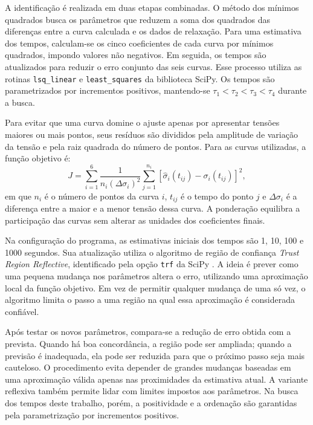 \documentclass[arial,centeredequations,english,brazilian,oneside,section=TITLE]{ifes8}
\begin{document}
A identificação é realizada em duas etapas combinadas. O método dos mínimos quadrados busca
os parâmetros que reduzem a soma dos quadrados das diferenças entre a curva calculada e
os dados de relaxação. Para uma estimativa dos tempos,
calculam-se os cinco coeficientes de cada curva por mínimos quadrados, impondo valores
não negativos. Em seguida, os tempos são atualizados para reduzir o erro conjunto das
seis curvas. Esse processo utiliza as rotinas \texttt{lsq\_linear} e
\texttt{least\_squares} da biblioteca SciPy. Os tempos são parametrizados por incrementos
positivos, mantendo-se $\tau_1<\tau_2<\tau_3<\tau_4$ durante a busca.

Para evitar que uma curva domine o ajuste apenas por apresentar tensões maiores ou mais
pontos, seus resíduos são divididos pela amplitude de variação da tensão e pela raiz
quadrada do número de pontos. Para as curvas utilizadas, a função objetivo é:
\begin{equation}
  \label{eq:objetivo-ajuste-global}
  J=\sum_{i=1}^{6}\frac{1}{n_i(\Delta\sigma_i)^2}
  \sum_{j=1}^{n_i}
  \left[\widehat{\sigma}_i(t_{ij})-\sigma_i(t_{ij})\right]^2,
\end{equation}
em que $n_i$ é o número de pontos da curva $i$, $t_{ij}$ é o tempo do ponto $j$ e
$\Delta\sigma_i$ é a diferença entre a maior e a menor tensão dessa curva. A ponderação
equilibra a participação das curvas sem alterar as unidades dos coeficientes finais.

Na configuração do programa, as estimativas iniciais dos tempos são 1, 10, 100 e
1000 segundos. Sua atualização utiliza o algoritmo de região de confiança
\emph{Trust Region Reflective}, identificado pela opção \texttt{trf} da SciPy
\cite{SciPyLeastSquares}. A ideia é prever como uma pequena mudança nos parâmetros altera
o erro, utilizando uma aproximação local da função objetivo. Em vez de permitir qualquer
mudança de uma só vez, o algoritmo limita o passo a uma região na qual essa aproximação
é considerada confiável.

Após testar os novos parâmetros, compara-se a redução de erro obtida com a prevista.
Quando há boa concordância, a região pode ser ampliada; quando a previsão é inadequada,
ela pode ser reduzida para que o próximo passo seja mais cauteloso. O procedimento evita
depender de grandes mudanças baseadas em uma aproximação válida apenas nas proximidades
da estimativa atual. A variante reflexiva também permite lidar com limites impostos aos
parâmetros. Na busca dos tempos deste trabalho, porém, a positividade e a ordenação são
garantidas pela parametrização por incrementos positivos.
\end{document}
